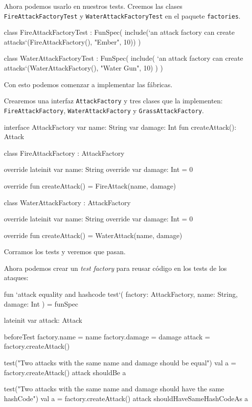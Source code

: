     Ahora podemos usarlo en nuestros tests.
    Creemos las clases \texttt{FireAttackFactoryTest} y \texttt{WaterAttackFactoryTest} en el paquete
    \texttt{factories}.

    \begin{kotlin}
      class FireAttackFactoryTest : FunSpec({
        include(`an attack factory can create attacks`(FireAttackFactory(), "Ember", 10))
      })
    \end{kotlin}

    \begin{kotlin}
      class WaterAttackFactoryTest : FunSpec({
        include(
          `an attack factory can create attacks`(WaterAttackFactory(), "Water Gun", 10)
        )
      })
    \end{kotlin}

    Con esto podemos comenzar a implementar las fábricas.

    Crearemos una interfaz \texttt{AttackFactory} y tres clases que la implementen:
    \texttt{FireAttackFactory}, \texttt{WaterAttackFactory} y \texttt{GrassAttackFactory}.

    \begin{kotlin}
      interface AttackFactory {
        var name: String
        var damage: Int
        fun createAttack(): Attack
      }
    \end{kotlin}

    \begin{kotlin}
      class FireAttackFactory : AttackFactory {
        override lateinit var name: String
        override var damage: Int = 0

        override fun createAttack() = FireAttack(name, damage)
      }
    \end{kotlin}

    \begin{kotlin}
      class WaterAttackFactory : AttackFactory {
        override lateinit var name: String
        override var damage: Int = 0

        override fun createAttack() = WaterAttack(name, damage)
      }
    \end{kotlin}

    Corramos los tests y veremos que pasan.

    Ahora podemos crear un \textit{test factory} para reusar código en los tests de los ataques:

    \begin{kotlin}
      fun `attack equality and hashcode test`(
        factory: AttackFactory, name: String, damage: Int
      ) = funSpec {
        lateinit var attack: Attack

        beforeTest {
          factory.name = name
          factory.damage = damage
          attack = factory.createAttack()
        }

        test("Two attacks with the same name and damage should be equal") {
          val a = factory.createAttack()
          attack shouldBe a
        }

        test("Two attacks with the same name and damage should have the same hashCode") {
          val a = factory.createAttack()
          attack shouldHaveSameHashCodeAs a
        }
      }
    \end{kotlin}

